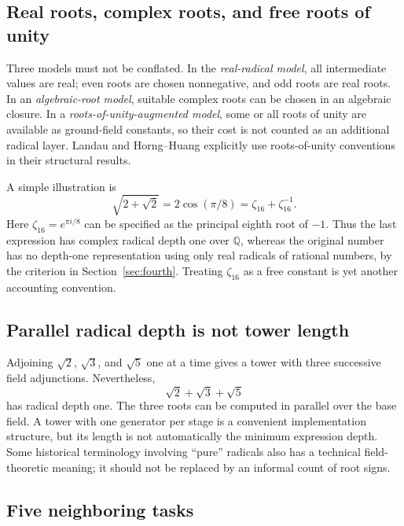 \documentclass[11pt,a4paper]{article}
\newcommand{\Q}{\mathbb{Q}}
\theoremstyle{definition}
\theoremstyle{remark}
\numberwithin{equation}{section}
\begin{document}
\subsection{Real roots, complex roots, and free roots of unity}

Three models must not be conflated. In the \emph{real-radical model}, all intermediate values are real; even roots are chosen nonnegative, and odd roots are real roots. In an \emph{algebraic-root model}, suitable complex roots can be chosen in an algebraic closure. In a \emph{roots-of-unity-augmented model}, some or all roots of unity are available as ground-field constants, so their cost is not counted as an additional radical layer. Landau and Horng--Huang explicitly use roots-of-unity conventions in their structural results.\cite{landau,horng1990,horng1999}

A simple illustration is
\[
 \sqrt{2+\sqrt2}=2\cos(\pi/8)=\zeta_{16}+\zeta_{16}^{-1}.
\]
Here $\zeta_{16}=e^{\pi i/8}$ can be specified as the principal eighth root of $-1$. Thus the last expression has complex radical depth one over $\Q$, whereas the original number has no depth-one representation using only real radicals of rational numbers, by the criterion in Section~\ref{sec:fourth}. Treating $\zeta_{16}$ as a free constant is yet another accounting convention.

\subsection{Parallel radical depth is not tower length}

Adjoining $\sqrt2$, $\sqrt3$, and $\sqrt5$ one at a time gives a tower with three successive field adjunctions. Nevertheless,
\[
 \sqrt2+\sqrt3+\sqrt5
\]
has radical depth one. The three roots can be computed in parallel over the base field. A tower with one generator per stage is a convenient implementation structure, but its length is not automatically the minimum expression depth. Some historical terminology involving ``pure'' radicals also has a technical field-theoretic meaning; it should not be replaced by an informal count of root signs.\cite{horng1990,honsbeek2005}

\subsection{Five neighboring tasks}
\end{document}
